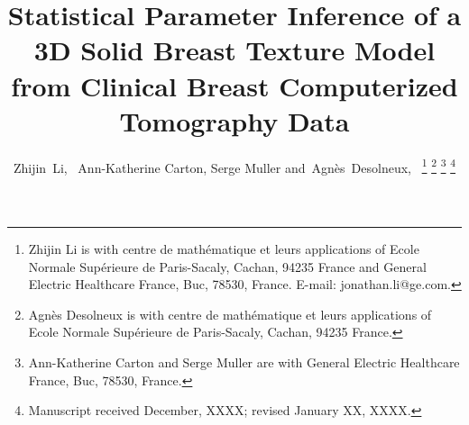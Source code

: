 \documentclass[journal]{IEEEtran}
\begin{document}
%
\title{Statistical Parameter Inference of a 3D Solid Breast Texture
  Model from Clinical Breast Computerized Tomography Data}
%
%
%

\author{Zhijin~Li,~ Ann-Katherine
  Carton, Serge Muller
  and~Agnès~Desolneux,~%
  \thanks{Zhijin Li is with centre de math\'{e}matique et leurs
    applications of Ecole Normale Sup\'{e}rieure de Paris-Sacaly,
    Cachan, 94235 France and General Electric Healthcare France, Buc,
    78530, France. E-mail: jonathan.li@ge.com.}%
  \thanks{Agnès Desolneux is with centre de math\'{e}matique et leurs
    applications of Ecole Normale Sup\'{e}rieure de Paris-Sacaly,
    Cachan, 94235 France.}%
  \thanks{Ann-Katherine Carton and Serge Muller are with General
    Electric Healthcare France, Buc, 78530,
    France.}%
  \thanks{Manuscript received December, XXXX; revised January XX,
    XXXX.}}

%
%
\end{document}
